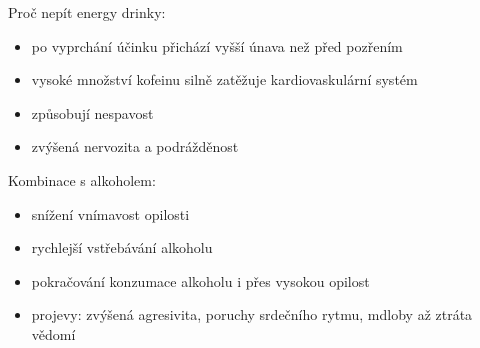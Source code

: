 \documentclass[pdf,blends]{prosper}
\begin{document}
\begin{slide}{Proč nepít energy drinky:}
\begin{itemize}
\item po vyprchání účinku přichází vyšší únava než před pozřením
\item vysoké množství kofeinu silně zatěžuje kardiovaskulární systém
\item způsobují nespavost
\item zvýšená nervozita a podrážděnost
\end{itemize}    
\begin{figure}[ht]
\begin{center}
\end{center}
\end{figure}
\end{slide}

\begin{slide}{Kombinace s alkoholem:}

\begin{itemize}
\item snížení vnímavost opilosti
\item rychlejší vstřebávání alkoholu
\item pokračování konzumace alkoholu i přes vysokou opilost
\item projevy: zvýšená agresivita, poruchy srdečního rytmu, mdloby až ztráta vědomí

\end{itemize}

\end{slide}
\end{document}
